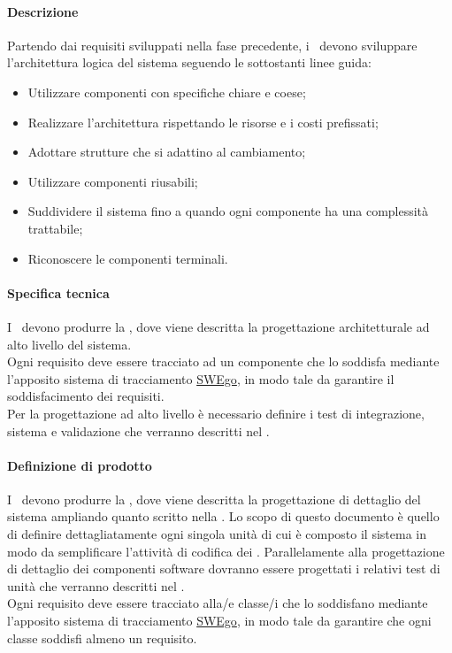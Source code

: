 \documentclass[../NormeDiProgetto.tex]{subfiles}
\begin{document}
			\paragraph{Descrizione\\}
				Partendo dai requisiti sviluppati nella fase precedente, i \progettisti\ devono
				sviluppare l'architettura logica del sistema seguendo le sottostanti linee guida:
				\begin{itemize}
					\item Utilizzare componenti con specifiche chiare e coese;
					\item Realizzare l'architettura rispettando le risorse e i costi prefissati;
					\item Adottare strutture che si adattino al cambiamento;
					\item Utilizzare componenti riusabili;
					\item Suddividere il sistema fino a quando ogni componente ha una
					complessità trattabile;
					\item Riconoscere le componenti terminali.
				\end{itemize}
			
			\paragraph{Specifica tecnica\\}
				I \progettisti\ devono produrre la \specificatecnica, dove viene descritta la progettazione architetturale ad
				alto livello del sistema. \\ Ogni requisito deve essere tracciato
				ad un componente che lo soddisfa mediante l'apposito sistema di tracciamento \hyperlink{SWEgo}{SWEgo},
				 in modo tale da garantire
				il soddisfacimento dei requisiti.\\
				Per la progettazione ad alto livello è necessario definire i test di integrazione, sistema e
				validazione che verranno descritti nel \pianodiqualifica.
			
			\paragraph{Definizione di prodotto\\}
				I \progettisti\ devono produrre la , dove viene descritta la progettazione di dettaglio del sistema ampliando quanto scritto nella \specificatecnica.
				Lo scopo di questo documento è quello di definire dettagliatamente ogni singola unità
				di cui è composto il sistema in modo da semplificare l’attività di codifica dei \programmatori.
				Parallelamente alla progettazione di dettaglio dei componenti software dovranno essere
				progettati i relativi test di unità che verranno descritti nel \pianodiqualifica. \\
				Ogni requisito deve essere tracciato alla/e classe/i che lo soddisfano mediante l'apposito sistema di tracciamento \hyperlink{SWEgo}{SWEgo}, in modo tale da garantire
				che ogni classe soddisfi almeno un requisito.\\
			
\end{document}
